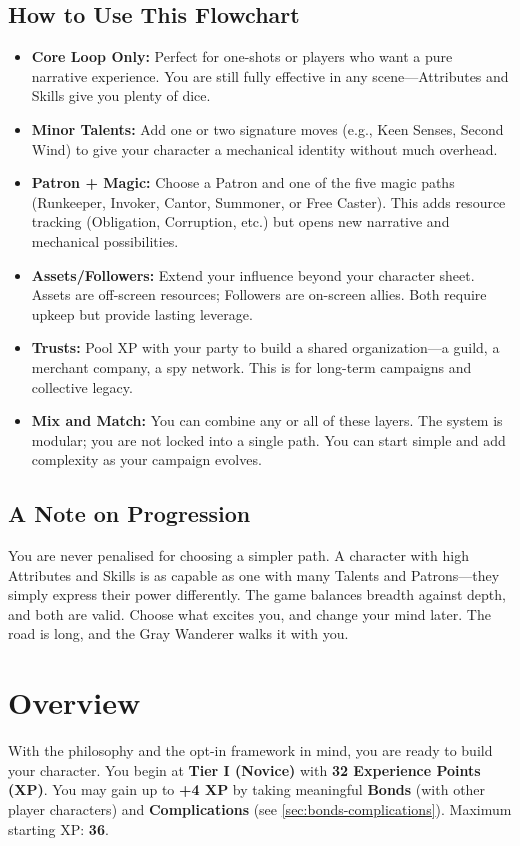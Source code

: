 \subsection*{How to Use This Flowchart}
\begin{itemize}
    \item \textbf{Core Loop Only:} Perfect for one-shots or players who want a pure narrative experience. You are still fully effective in any scene---Attributes and Skills give you plenty of dice.
    \item \textbf{Minor Talents:} Add one or two signature moves (e.g., Keen Senses, Second Wind) to give your character a mechanical identity without much overhead.
    \item \textbf{Patron + Magic:} Choose a Patron and one of the five magic paths (Runkeeper, Invoker, Cantor, Summoner, or Free Caster). This adds resource tracking (Obligation, Corruption, etc.) but opens new narrative and mechanical possibilities.
    \item \textbf{Assets/Followers:} Extend your influence beyond your character sheet. Assets are off-screen resources; Followers are on-screen allies. Both require upkeep but provide lasting leverage.
    \item \textbf{Trusts:} Pool XP with your party to build a shared organization---a guild, a merchant company, a spy network. This is for long-term campaigns and collective legacy.
    \item \textbf{Mix and Match:} You can combine any or all of these layers. The system is modular; you are not locked into a single path. You can start simple and add complexity as your campaign evolves.
\end{itemize}

\subsection*{A Note on Progression}
You are never penalised for choosing a simpler path. A character with high Attributes and Skills is as capable as one with many Talents and Patrons---they simply express their power differently. The game balances breadth against depth, and both are valid. Choose what excites you, and change your mind later. The road is long, and the Gray Wanderer walks it with you.

\section{Overview}
With the philosophy and the opt-in framework in mind, you are ready to build your character. You begin at \textbf{Tier I (Novice)} with \textbf{32 Experience Points (XP)}. You may gain up to \textbf{+4 XP} by taking meaningful \textbf{Bonds} (with other player characters) and \textbf{Complications} (see \ref{sec:bonds-complications}). Maximum starting XP: \textbf{36}.

